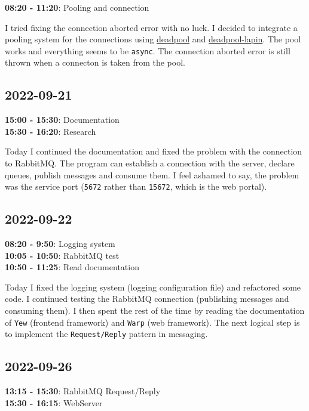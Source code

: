 \documentclass{article}
\begin{document}
\textbf{08:20 - 11:20}: Pooling and connection

I tried fixing the connection aborted error with no luck.
I decided to integrate a pooling system for the connections using
\href{https://docs.rs/deadpool/latest/deadpool}{deadpool} and
\href{https://docs.rs/deadpool-lapin/0.10.0/deadpool_lapin}{deadpool-lapin}.
The pool works and everything seems to be \texttt{async}. The connection
aborted error is still thrown when a connecton is taken from the pool.

\subsection{2022-09-21}

\textbf{15:00 - 15:30}: Documentation \\
\textbf{15:30 - 16:20}: Research

Today I continued the documentation
and fixed the problem with the connection to RabbitMQ.
The program can establish a connection with the server,
declare queues, publish messages and consume them.
I feel ashamed to say, the problem was the service port
(\texttt{5672} rather than \texttt{15672}, which is the web portal).

\subsection{2022-09-22}

\textbf{08:20 - 9:50}: Logging system \\
\textbf{10:05 - 10:50}: RabbitMQ test \\
\textbf{10:50 - 11:25}: Read documentation

Today I fixed the logging system (logging configuration file) and refactored some code.
I continued testing the RabbitMQ connection (publishing messages and consuming them).
I then spent the rest of the time by reading the documentation of \texttt{Yew} (frontend framework)
and \texttt{Warp} (web framework). The next logical step is to implement the \texttt{Request/Reply} pattern
in messaging.

\subsection{2022-09-26}

\textbf{13:15 - 15:30}: RabbitMQ Request/Reply \\
\textbf{15:30 - 16:15}: WebServer
\end{document}
